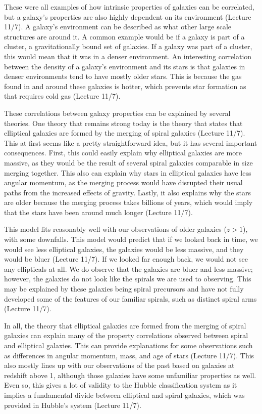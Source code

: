 \documentclass[12pt]{article}
\begin{document}
These were all examples of how intrinsic properties of galaxies can be
correlated, but a galaxy's properties are also highly dependent on its
environment (Lecture 11/7).  A galaxy's environment can be described as what
other large scale
structures are around it.  A common example would be if a galaxy is part of a
cluster, a gravitationally bound set of galaxies.  If a galaxy was part of a
cluster, this would mean that it was in a denser environment.  An interesting
correlation between the density of a galaxy's environment and its stars is that
galaxies in denser environments tend to have mostly older stars.  This is
because the gas found in and around these galaxies is hotter, which prevents
star formation as that requires cold gas (Lecture 11/7).

These correlations between galaxy properties can be explained by several
theories.  One theory that remains strong today is the theory that states that
elliptical galaxies are formed by the merging of spiral galaxies (Lecture 11/7).
This at first
seems like a pretty straightforward idea, but it has several important
consequences.  First, this could easily explain why elliptical galaxies are more
massive, as they would be the result of several spiral galaxies comparable in
size merging together.  This also can explain why stars in elliptical galaxies
have less angular momentum, as the merging process would have disrupted their
usual paths from the increased effects of gravity.  Lastly, it also explains why
the stars are older because the merging process takes billions of years, which
would imply that the stars have been around much longer (Lecture 11/7).

This model fits reasonably well with our observations of older galaxies ($z>1$),
with some downfalls. This model would predict that if we looked back in time, we
would see less elliptical galaxies, the galaxies would be less massive, and they
would be bluer (Lecture 11/7).  If we looked far enough back, we would not see any
ellipticals
at all.  We do observe that the galaxies are bluer and less massive; however,
the galaxies do not look like the spirals we are used to observing.  This may be
explained by these galaxies being spiral precursors and have not fully developed
some of the features of our familiar spirals, such as distinct spiral arms
(Lecture 11/7).

In all, the theory that elliptical galaxies are formed from the merging of
spiral galaxies can explain many of the property correlations observed between
spiral and elliptical galaxies.  This can provide explanations for some
observations such as differences in angular momentum, mass, and age of stars
(Lecture 11/7).
This also mostly lines up with our observations of the past based on galaxies at
redshift above 1, although those galaxies have some unfamiliar properties as
well. Even so, this gives a lot of validity to the Hubble classification system
as it implies a fundamental divide between elliptical and spiral galaxies, which
was provided in Hubble's system (Lecture 11/7).
\end{document}
